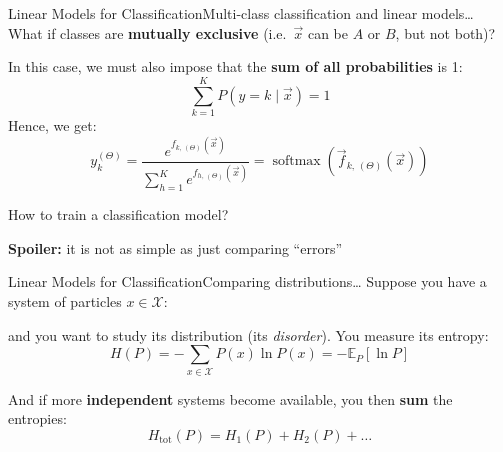 \begin{frame}{Linear Models for Classification}{Multi-class classification and linear models\dots}
    What if classes are \textbf{mutually exclusive} (i.e.\ $\vec{x}$ can be $A$ or $B$, but not both)?

    \vfill

    In this case, we must also impose that the \textbf{sum of all probabilities} is 1:
    \begin{equation*}
        \sum\limits_{k = 1}^K P(y = k \mid \vec{x}) = 1
    \end{equation*}
    Hence, we get:
    \begin{equation*}
        y_k^{(\Theta)}
        =
        \frac{e^{f_{k,\, (\Theta)}(\vec{x})}}{\sum\limits_{h = 1}^K e^{f_{h,\, (\Theta)}(\vec{x})}}
        =
        \operatorname{softmax}(\vec{f}_{k,\, (\Theta)}(\vec{x}))
    \end{equation*}

    \vfill \pause

    \begin{center}
        How to train a classification model?

        {\tiny \textbf{Spoiler:} it is not as simple as just comparing \enquote{errors}}
    \end{center}
\end{frame}

\begin{frame}{Linear Models for Classification}{Comparing distributions\dots}
    Suppose you have a system of particles $x \in \mathcal{X}$:
    \begin{center}
        
    \end{center}
    and you want to study its distribution (its \emph{disorder}).
    You measure its entropy:
    \begin{equation*}
        H(P) = - \sum\limits_{x \in \mathcal{X}} P(x) \ln P(x) = - \mathbb{E}_P[\ln P]
    \end{equation*}

    \vfill

    And if more \textbf{independent} systems become available, you then \textbf{sum} the entropies:
    \begin{equation*}
        H_{\text{tot}}(P)
        =
        H_1(P) + H_2(P) + \dots
    \end{equation*}
\end{frame}

